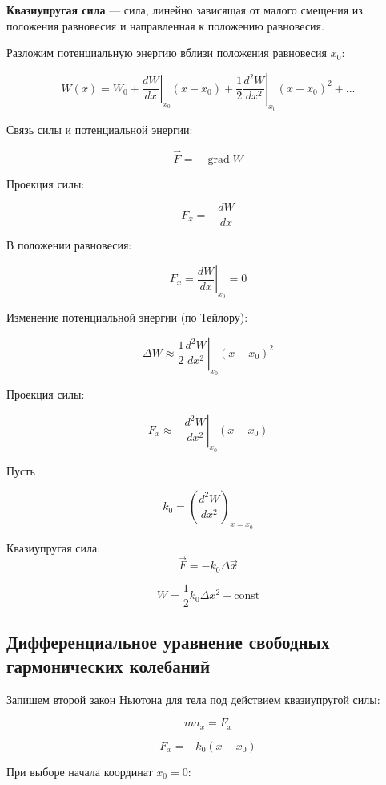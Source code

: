\documentclass[a4paper,12pt]{article}
\begin{document}
\begin{definitionbox}
\textbf{Квазиупругая сила} — сила, линейно зависящая от малого смещения из положения равновесия и направленная к положению равновесия.
\end{definitionbox}

Разложим потенциальную энергию вблизи положения равновесия $x_0$:

\[
W(x)
=
W_0
+
\left.
\frac{dW}{dx}
\right|_{x_0}
(x-x_0)
+
\frac{1}{2}
\left.
\frac{d^2 W}{dx^2}
\right|_{x_0}
(x-x_0)^2
+ ...
\]

Связь силы и потенциальной энергии:

\[
\vec F
=
-\operatorname{grad} W
\]

Проекция силы:

\[
F_x
=
-
\frac{dW}{dx}
\]

В положении равновесия:

\[
F_x =
\left.
\frac{dW}{dx}
\right|_{x_0}
=
0
\]

Изменение потенциальной энергии (по Тейлору):

\[
\Delta W
\approx
\frac{1}{2}
\left.
\frac{d^2 W}{dx^2}
\right|_{x_0}
(x-x_0)^2
\]

Проекция силы:

\[
F_x
\approx
-
\left.
\frac{d^2 W}{dx^2}
\right|_{x_0}
(x-x_0)
\] 

Пусть 

\[
k_0
=
\left(
\frac{d^2 W}{dx^2}
\right)_{x=x_0}
\]

\begin{definitionbox}
Квазиупругая сила:
\[
\vec F
=
-
k_0
\Delta \vec x
\]
\end{definitionbox}

\[
W
=
\frac{1}{2}
k_0
\Delta x^2
+
\text{const}
\]

\vspace{0.8em}

\subsection*{Дифференциальное уравнение свободных гармонических колебаний}

Запишем второй закон Ньютона для тела под действием квазиупругой силы:

\[
m a_x = F_x
\]

\[
F_x = -k_0 (x-x_0)
\]





При выборе начала координат $x_0=0$:
\end{document}
